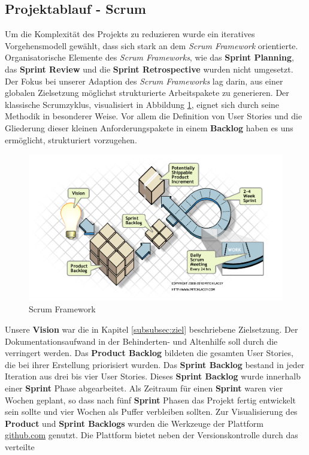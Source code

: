 \subsection{Projektablauf - Scrum}
Um die Komplexität des Projekts zu reduzieren wurde ein iteratives Vorgehensmodell gewählt, dass sich stark an dem \textit{Scrum Framework}
orientierte. Organisatorische Elemente des \textit{Scrum Frameworks}, wie das \textbf{Sprint Planning}, das \textbf{Sprint Review} und die
\textbf{Sprint Retrospective} wurden nicht umgesetzt. Der Fokus bei unserer Adaption des \textit{Scrum Frameworks} lag darin, aus einer
globalen Zielsetzung möglichst strukturierte Arbeitspakete zu generieren. Der klassische Scrumzyklus, visualisiert in Abbildung \ref{ScrumFramework},
eignet sich durch seine Methodik in besonderer Weise. Vor allem die Definition von User Stories und die Gliederung dieser kleinen Anforderungspakete in einem
\textbf{Backlog} haben es uns ermöglicht, strukturiert vorzugehen. \\
\begin{figure}[htp]
	\includegraphics[width=\textwidth]{ScrumFrameworkFlow}
	\caption{Scrum Framework}
	\label{ScrumFramework}
\end{figure}
Unsere \textbf{Vision} war die in Kapitel \ref{subsubsec:ziel} beschriebene Zielsetzung. Der Dokumentationsaufwand in der Behinderten- und Altenhilfe
soll durch die \EBP verringert werden. Das \textbf{Product Backlog} bildeten die gesamten User Stories, die bei ihrer Erstellung priorisiert wurden.
Das \textbf{Sprint Backlog} bestand in jeder Iteration aus drei bis vier User Stories. Dieses \textbf{Sprint Backlog} wurde innerhalb einer
\textbf{Sprint} Phase abgearbeitet. Als Zeitraum für einen \textbf{Sprint} waren vier Wochen geplant, so dass nach fünf \textbf{Sprint} Phasen das
Projekt fertig entwickelt sein sollte und vier Wochen als Puffer verbleiben sollten. Zur Visualisierung des \textbf{Product} und \textbf{Sprint
Backlogs} wurden die Werkzeuge der Plattform \url{github.com} genutzt. Die Plattform bietet neben der Versionskontrolle durch das verteilte
